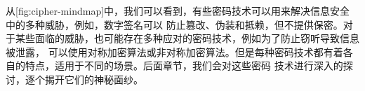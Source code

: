 从[fig:cipher-mindmap]中，我们可以看到，有些密码技术可以用来解决信息安全中的多种威胁，例如，数字签名可以
防止篡改、伪装和抵赖，但不提供保密。对于某些面临的威胁，也可能存在多种应对的密码技术，例如为了防止窃听导致信息被泄露，
可以使用对称加密算法或非对称加密算法。但是每种密码技术都有着各自的特点，适用于不同的场景。后面章节，我们会对这些密码
技术进行深入的探讨，逐个揭开它们的神秘面纱。


\stopsection
